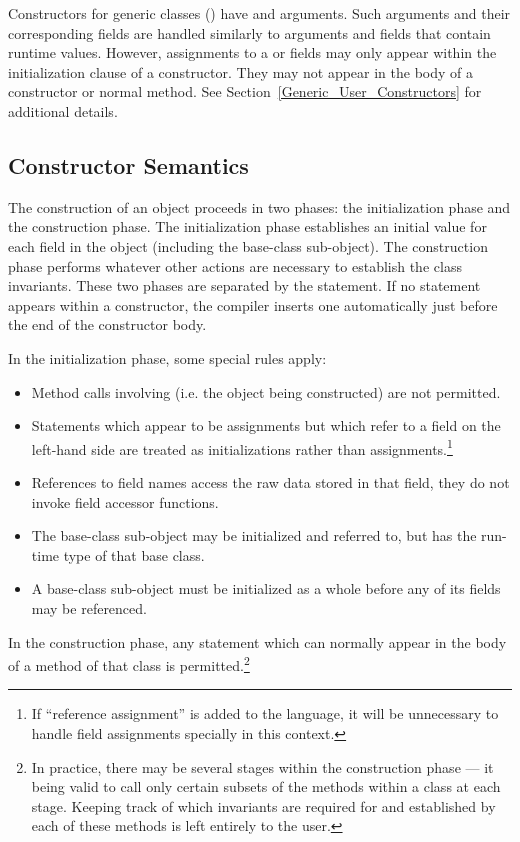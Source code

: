 Constructors for generic classes () have 
and  arguments.  Such arguments and their corresponding fields are
handled similarly to arguments and fields that contain runtime values.  However,
assignments to a  or  fields may only appear within the
initialization clause of a constructor.  They may not appear in the body of a
constructor or normal method.
See Section~\ref{Generic_User_Constructors} for additional
details.  

\subsection{Constructor Semantics}
\label{Constructor_Semantics}

The construction of an object proceeds in two phases: the initialization phase
and the construction phase.  The initialization phase establishes an initial
value for each field in the object (including the base-class sub-object).  The
construction phase performs whatever other actions are necessary to establish
the class invariants.  These two phases are separated by the 
statement.  If no  statement appears within a constructor, the
compiler inserts one automatically just before the end of the constructor
body.

In the initialization phase, some special rules apply:
\begin{itemize}
\item Method calls involving  (i.e. the object being constructed) are not permitted.  
\item Statements which appear to be assignments but which refer to a field on
the left-hand side are treated as initializations rather than
assignments.\footnote{If ``reference assignment'' is added to the language, it
will be unnecessary to handle field assignments specially in this context.}
\item References to field names access the raw data stored in that field, they
do not invoke field accessor functions.
\item The base-class sub-object may be initialized and referred to, but has the
run-time type of that base class.
\item A base-class sub-object must be initialized as a whole before any of its
fields may be referenced.
\end{itemize}
\noindent
In the construction phase, any statement which can normally appear in the body
of a method of that class is permitted.\footnote{In practice, there may be
several stages within the construction phase --- it being valid to call only
certain subsets of the methods within a class at each stage.  Keeping track of
which invariants are required for and established by each of these methods is
left entirely to the user.}

